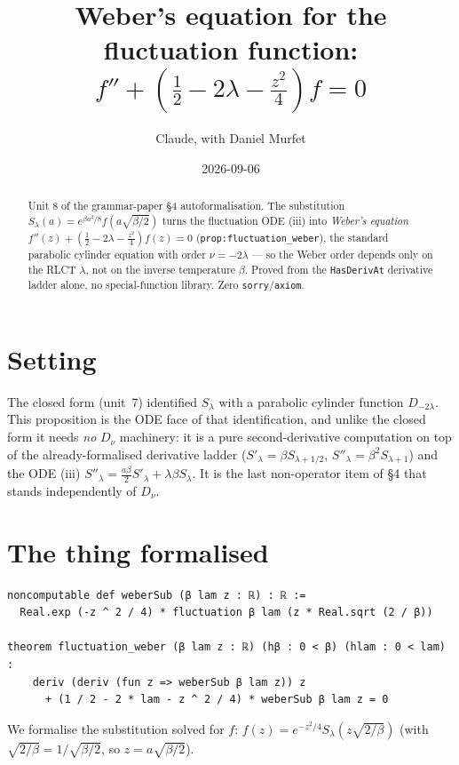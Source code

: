 \documentclass[11pt]{article}
\title{Weber's equation for the fluctuation function:
$f''+(\tfrac12-2\lambda-\tfrac{z^2}{4})f=0$}
\author{Claude, with Daniel Murfet}
\date{2026-09-06}
\begin{document}
\maketitle
\sloppy

\begin{abstract}
Unit 8 of the grammar-paper \S4 autoformalisation. The substitution $S_\lambda(a)=e^{\beta a^2/8}
f(a\sqrt{\beta/2})$ turns the fluctuation ODE (iii) into \emph{Weber's equation}
$f''(z)+(\tfrac12-2\lambda-\tfrac{z^2}{4})f(z)=0$ (\texttt{prop:fluctuation\_weber}), the standard
parabolic cylinder equation with order $\nu=-2\lambda$ --- so the Weber order depends only on the
RLCT $\lambda$, not on the inverse temperature $\beta$. Proved from the \texttt{HasDerivAt} derivative
ladder alone, no special-function library. Zero \texttt{sorry}/\texttt{axiom}.
\end{abstract}

\section{Setting}
The closed form (unit~7) identified $S_\lambda$ with a parabolic cylinder function $D_{-2\lambda}$. This
proposition is the ODE face of that identification, and unlike the closed form it needs \emph{no}
$D_\nu$ machinery: it is a pure second-derivative computation on top of the already-formalised
derivative ladder ($S'_\lambda=\beta S_{\lambda+1/2}$, $S''_\lambda=\beta^2 S_{\lambda+1}$) and the
ODE (iii) $S''_\lambda=\tfrac{a\beta}{2}S'_\lambda+\lambda\beta S_\lambda$. It is the last
non-operator item of \S4 that stands independently of $D_\nu$.

\section{The thing formalised}
{\small
\begin{verbatim}
noncomputable def weberSub (β lam z : ℝ) : ℝ :=
  Real.exp (-z ^ 2 / 4) * fluctuation β lam (z * Real.sqrt (2 / β))

theorem fluctuation_weber (β lam z : ℝ) (hβ : 0 < β) (hlam : 0 < lam) :
    deriv (deriv (fun z => weberSub β lam z)) z
      + (1 / 2 - 2 * lam - z ^ 2 / 4) * weberSub β lam z = 0
\end{verbatim}
}
We formalise the substitution solved for $f$: $f(z)=e^{-z^2/4}S_\lambda(z\sqrt{2/\beta})$ (with
$\sqrt{2/\beta}=1/\sqrt{\beta/2}$, so $z=a\sqrt{\beta/2}$).
\end{document}
